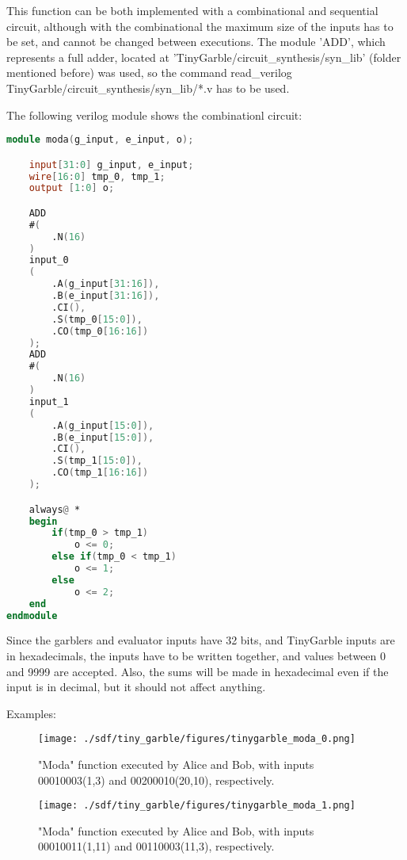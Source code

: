 \begin{refsection}
This function can be both implemented with a combinational and sequential circuit, although with the combinational the maximum size of the inputs has to be set, and cannot be changed between executions.
The module 'ADD', which represents a full adder, located at 'TinyGarble/circuit\_synthesis/syn\_lib' (folder mentioned before) was used, so the command read\_verilog TinyGarble/circuit\_synthesis/syn\_lib/*.v has to be used.

The following verilog module shows the combinationl circuit:

\newpage

\begin{lstlisting}[caption={moda.v}, language=Verilog, captionpos=b]
module moda(g_input, e_input, o);

	input[31:0] g_input, e_input;
	wire[16:0] tmp_0, tmp_1;
	output [1:0] o;

	ADD 
	#(
		.N(16)
	)
	input_0
	(
		.A(g_input[31:16]),
		.B(e_input[31:16]),
		.CI(),
		.S(tmp_0[15:0]),
		.CO(tmp_0[16:16])
	);
	ADD 
	#(
		.N(16)
	)
	input_1
	(
		.A(g_input[15:0]),
		.B(e_input[15:0]),
		.CI(),
		.S(tmp_1[15:0]),
		.CO(tmp_1[16:16])
	);	

	always@ *
	begin
		if(tmp_0 > tmp_1)
			o <= 0;
		else if(tmp_0 < tmp_1)
			o <= 1;
		else
			o <= 2;
	end
endmodule
\end{lstlisting}

\newpage
Since the garblers and evaluator inputs have 32 bits, and TinyGarble inputs are in hexadecimals, the inputs have to be written together, and values between 0 and 9999 are accepted. Also, the sums will be made in hexadecimal even if the input is in decimal, but it should not affect anything.

Examples:

\begin{figure}[H]
	\centering
	\texttt{[image: ./sdf/tiny\_garble/figures/tinygarble\_moda\_0.png]}
    \caption{"Moda" function executed by Alice and Bob, with inputs 00010003(1,3) and 00200010(20,10), respectively.}\label{fig:tinygarble_moda_0}
\end{figure}

\begin{figure}[H]
	\centering
	\texttt{[image: ./sdf/tiny\_garble/figures/tinygarble\_moda\_1.png]}
    \caption{"Moda" function executed by Alice and Bob, with inputs 00010011(1,11) and 00110003(11,3), respectively.}\label{fig:tinygarble_moda_1}
\end{figure}


\end{refsection}
